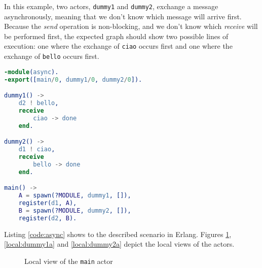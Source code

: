 \begin{exmp}
In this example, two actors, \texttt{dummy1} and \texttt{dummy2}, exchange a 
message asynchronously, meaning that we don't know which message will arrive 
first. Because the \textit{send} operation is non-blocking, and we don't know 
which \textit{receive} will be performed first, the expected graph should show 
two possible lines of execution: one where the exchange of \texttt{ciao} occurs 
first and one where the exchange of \texttt{bello} occurs first.

\bigskip

\begin{lstlisting}[language=Erlang, caption=Two processes exchanging messages 
asynchronously, label=code:async]
-module(async).
-export([main/0, dummy1/0, dummy2/0]).

dummy1() ->
    d2 ! bello,
    receive
        ciao -> done
    end.

dummy2() ->
    d1 ! ciao,
    receive
        bello -> done
    end.

main() ->
    A = spawn(?MODULE, dummy1, []),
    register(d1, A),
    B = spawn(?MODULE, dummy2, []),
    register(d2, B).
\end{lstlisting}

Listing \ref{code:async} shows to the described scenario in Erlang. Figures 
\ref{local:main}, \ref{local:dummy1a} and \ref{local:dummy2a} depict the local
views of the actors.

\begin{figure}[!ht]
    \centering
    \caption{Local view of the \texttt{main} actor}
    \label{local:main}
\end{figure}

\begin{figure}[!ht]
    \centering
\end{figure}
\end{exmp}
